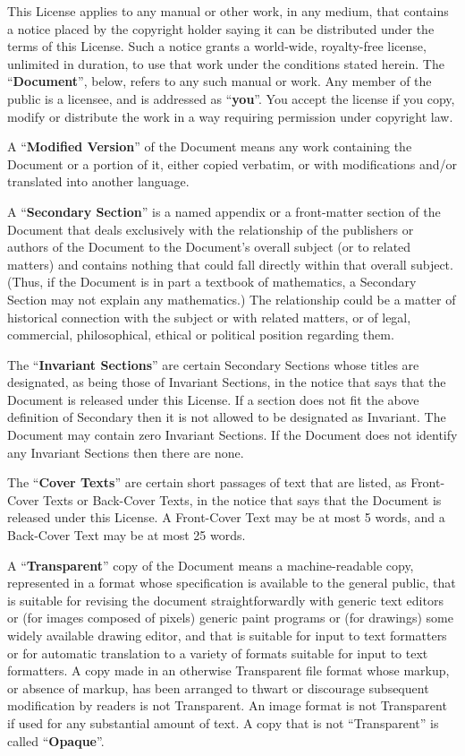 \documentclass[a4paper,11pt,oneside]{book}
\begin{document}
This License applies to any manual or other work, in any medium, that
contains a notice placed by the copyright holder saying it can be
distributed under the terms of this License.  Such a notice grants a
world-wide, royalty-free license, unlimited in duration, to use that
work under the conditions stated herein.  The ``\textbf{Document}'', below,
refers to any such manual or work.  Any member of the public is a
licensee, and is addressed as ``\textbf{you}''.  You accept the license if you
copy, modify or distribute the work in a way requiring permission
under copyright law.

A ``\textbf{Modified Version}'' of the Document means any work containing the
Document or a portion of it, either copied verbatim, or with
modifications and/or translated into another language.

A ``\textbf{Secondary Section}'' is a named appendix or a front-matter section of
the Document that deals exclusively with the relationship of the
publishers or authors of the Document to the Document's overall subject
(or to related matters) and contains nothing that could fall directly
within that overall subject.  (Thus, if the Document is in part a
textbook of mathematics, a Secondary Section may not explain any
mathematics.)  The relationship could be a matter of historical
connection with the subject or with related matters, or of legal,
commercial, philosophical, ethical or political position regarding
them.

The ``\textbf{Invariant Sections}'' are certain Secondary Sections whose titles
are designated, as being those of Invariant Sections, in the notice
that says that the Document is released under this License.  If a
section does not fit the above definition of Secondary then it is not
allowed to be designated as Invariant.  The Document may contain zero
Invariant Sections.  If the Document does not identify any Invariant
Sections then there are none.

The ``\textbf{Cover Texts}'' are certain short passages of text that are listed,
as Front-Cover Texts or Back-Cover Texts, in the notice that says that
the Document is released under this License.  A Front-Cover Text may
be at most 5 words, and a Back-Cover Text may be at most 25 words.

A ``\textbf{Transparent}'' copy of the Document means a machine-readable copy,
represented in a format whose specification is available to the
general public, that is suitable for revising the document
straightforwardly with generic text editors or (for images composed of
pixels) generic paint programs or (for drawings) some widely available
drawing editor, and that is suitable for input to text formatters or
for automatic translation to a variety of formats suitable for input
to text formatters.  A copy made in an otherwise Transparent file
format whose markup, or absence of markup, has been arranged to thwart
or discourage subsequent modification by readers is not Transparent.
An image format is not Transparent if used for any substantial amount
of text.  A copy that is not ``Transparent'' is called ``\textbf{Opaque}''.
\end{document}
